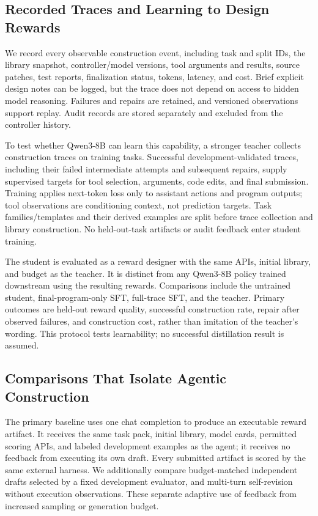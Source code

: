 \subsection{Recorded Traces and Learning to Design Rewards}
\label{sec:trace_learning}

We record every observable construction event, including task and split IDs, the library snapshot, controller/model versions, tool arguments and results, source patches, test reports, finalization status, tokens, latency, and cost. Brief explicit design notes can be logged, but the trace does not depend on access to hidden model reasoning. Failures and repairs are retained, and versioned observations support replay. Audit records are stored separately and excluded from the controller history.

To test whether Qwen3-8B can learn this capability, a stronger teacher collects construction traces on training tasks. Successful development-validated traces, including their failed intermediate attempts and subsequent repairs, supply supervised targets for tool selection, arguments, code edits, and final submission. Training applies next-token loss only to assistant actions and program outputs; tool observations are conditioning context, not prediction targets. Task families/templates and their derived examples are split before trace collection and library construction. No held-out-task artifacts or audit feedback enter student training.

The student is evaluated as a reward designer with the same APIs, initial library, and budget as the teacher. It is distinct from any Qwen3-8B policy trained downstream using the resulting rewards. Comparisons include the untrained student, final-program-only SFT, full-trace SFT, and the teacher. Primary outcomes are held-out reward quality, successful construction rate, repair after observed failures, and construction cost, rather than imitation of the teacher's wording. This protocol tests learnability; no successful distillation result is assumed.

\subsection{Comparisons That Isolate Agentic Construction}
\label{sec:design_controls}

The primary baseline uses one chat completion to produce an executable reward artifact. It receives the same task pack, initial library, model cards, permitted scoring APIs, and labeled development examples as the agent; it receives no feedback from executing its own draft. Every submitted artifact is scored by the same external harness. We additionally compare budget-matched independent drafts selected by a fixed development evaluator, and multi-turn self-revision without execution observations. These separate adaptive use of feedback from increased sampling or generation budget.

